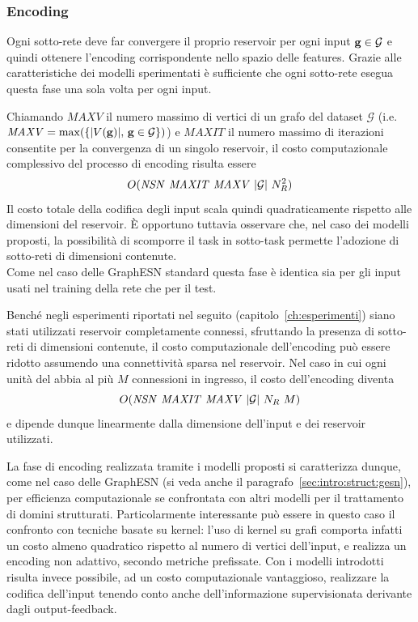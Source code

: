 \subsubsection*{Encoding}
Ogni sotto-rete deve far convergere il proprio reservoir per ogni input $\mathbf{g} \in \mathcal{G}$ e quindi ottenere l'encoding corrispondente nello spazio delle features. Grazie alle caratteristiche dei modelli sperimentati è sufficiente che ogni sotto-rete esegua questa fase una sola volta per ogni input. 

Chiamando $\mathit{MAXV}$ il numero massimo di vertici di un grafo del dataset $\mathcal{G}$ (i.e.\ $\mathit{MAXV} = \max(\{ \lvert V(\mathbf{g})\rvert,\, \mathbf{g} \in \mathcal{G} \})$) e $\mathit{MAXIT}$ il numero massimo di iterazioni consentite per la convergenza di un singolo reservoir, il costo computazionale complessivo del processo di encoding risulta essere
\begin{equation}
	O( \mathit{NSN}\ \mathit{MAXIT}\ \mathit{MAXV}\ \abs{\mathcal{G}}\ N_R^2 )
\end{equation}
Il costo totale della codifica degli input scala quindi quadraticamente rispetto alle dimensioni del reservoir. \`E opportuno tuttavia osservare che, nel caso dei modelli proposti, la possibilità di scomporre il task in sotto-task permette l'adozione di sotto-reti di dimensioni contenute.
\\
Come nel caso delle GraphESN standard questa fase è identica sia per gli input usati nel training della rete che per il test.

Benché negli esperimenti riportati nel seguito (capitolo~\ref{ch:esperimenti}) siano stati utilizzati reservoir completamente connessi, sfruttando la presenza di sotto-reti di dimensioni contenute, il costo computazionale dell'encoding può essere ridotto assumendo una connettività sparsa nel reservoir. Nel caso in cui ogni unità del abbia al più $M$ connessioni in ingresso, il costo dell'encoding diventa
\begin{equation}
	O( \mathit{NSN}\ \mathit{MAXIT}\ \mathit{MAXV}\ \abs{\mathcal{G}}\ N_R\ M )
\end{equation}
e dipende dunque linearmente dalla dimensione dell'input e dei reservoir utilizzati.

La fase di encoding realizzata tramite i modelli proposti si caratterizza dunque, come nel caso delle GraphESN (si veda anche il paragrafo~\ref{sec:intro:struct:gesn}), per efficienza computazionale se confrontata con altri modelli per il trattamento di domini strutturati. 
Particolarmente interessante può essere in questo caso il confronto con tecniche basate su kernel: l'uso di kernel su grafi \cite{Frohlich:AssignmentKernels} comporta infatti un costo almeno quadratico rispetto al numero di vertici dell'input, e realizza un encoding non adattivo, secondo metriche prefissate. Con i modelli introdotti risulta invece possibile, ad un costo computazionale vantaggioso, realizzare la codifica dell'input tenendo conto anche dell'informazione supervisionata derivante dagli output-feedback.

